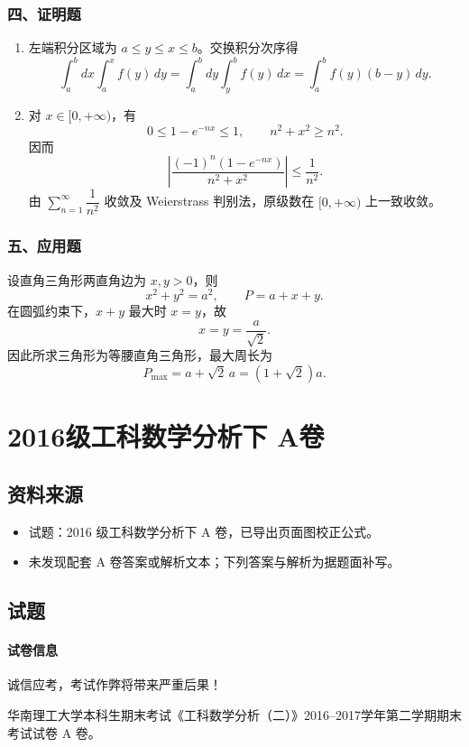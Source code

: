 \subsubsection*{四、证明题}
\begin{enumerate}
  \item 左端积分区域为 $a\le y\le x\le b$。交换积分次序得
  \[
  \int_a^b dx\int_a^x f(y)\,dy
  =\int_a^b dy\int_y^b f(y)\,dx
  =\int_a^b f(y)(b-y)\,dy.
  \]
  \item 对 $x\in[0,+\infty)$，有
  \[
  0\le 1-e^{-nx}\le1,\qquad n^2+x^2\ge n^2.
  \]
  因而
  \[
  \left|\frac{(-1)^n(1-e^{-nx})}{n^2+x^2}\right|\le\frac1{n^2}.
  \]
  由 $\sum_{n=1}^{\infty}\dfrac1{n^2}$ 收敛及 Weierstrass 判别法，原级数在 $[0,+\infty)$ 上一致收敛。
\end{enumerate}

\subsubsection*{五、应用题}
设直角三角形两直角边为 $x,y>0$，则
\[
x^2+y^2=a^2,\qquad P=a+x+y.
\]
在圆弧约束下，$x+y$ 最大时 $x=y$，故
\[
x=y=\frac{a}{\sqrt2}.
\]
因此所求三角形为等腰直角三角形，最大周长为
\[
P_{\max}=a+\sqrt2\,a=(1+\sqrt2)a.
\]

\section{2016级工科数学分析下 A卷}

\subsection{资料来源}
\begin{itemize}
  \item 试题：2016 级工科数学分析下 A 卷，已导出页面图校正公式。
  \item 未发现配套 A 卷答案或解析文本；下列答案与解析为据题面补写。
\end{itemize}

\subsection{试题}

\paragraph*{试卷信息}
诚信应考，考试作弊将带来严重后果！

华南理工大学本科生期末考试《工科数学分析（二）》2016--2017学年第二学期期末考试试卷 A 卷。

